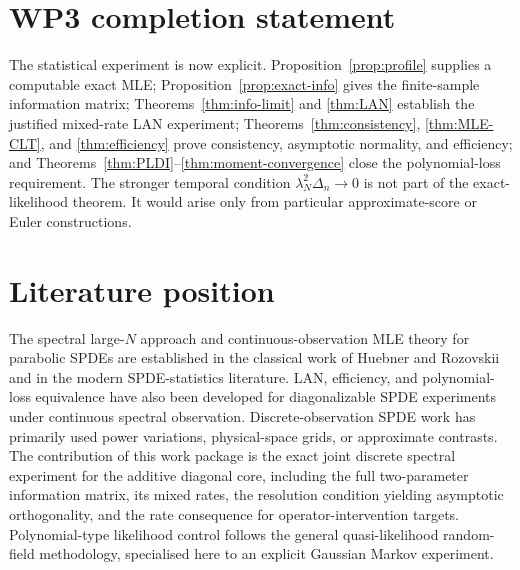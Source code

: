 \documentclass[11pt]{article}
\theoremstyle{remark}
\newcommand{\1}{\mathbf 1}
\begin{document}
\section{WP3 completion statement}

The statistical experiment is now explicit.  Proposition~\ref{prop:profile} supplies a computable exact MLE; Proposition~\ref{prop:exact-info} gives the finite-sample information matrix; Theorems~\ref{thm:info-limit} and \ref{thm:LAN} establish the justified mixed-rate LAN experiment; Theorems~\ref{thm:consistency}, \ref{thm:MLE-CLT}, and \ref{thm:efficiency} prove consistency, asymptotic normality, and efficiency; and Theorems~\ref{thm:PLDI}--\ref{thm:moment-convergence} close the polynomial-loss requirement.  The stronger temporal condition $\lambda_N^2\Delta_n\to0$ is not part of the exact-likelihood theorem.  It would arise only from particular approximate-score or Euler constructions.

\section*{Literature position}

The spectral large-$N$ approach and continuous-observation MLE theory for parabolic SPDEs are established in the classical work of Huebner and Rozovskii and in the modern SPDE-statistics literature.  LAN, efficiency, and polynomial-loss equivalence have also been developed for diagonalizable SPDE experiments under continuous spectral observation.  Discrete-observation SPDE work has primarily used power variations, physical-space grids, or approximate contrasts.  The contribution of this work package is the exact joint discrete spectral experiment for the additive diagonal core, including the full two-parameter information matrix, its mixed rates, the resolution condition yielding asymptotic orthogonality, and the rate consequence for operator-intervention targets.  Polynomial-type likelihood control follows the general quasi-likelihood random-field methodology, specialised here to an explicit Gaussian Markov experiment.
\end{document}
